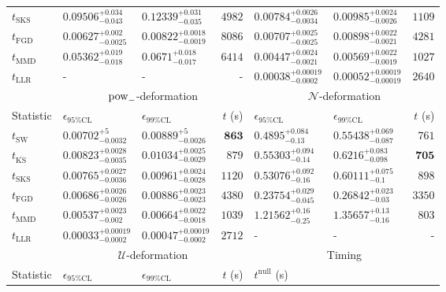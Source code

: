 \begin{tabular}{l|llr|llr}
	$t_{\mathrm{SKS}}$ & $0.09506_{-0.043}^{+0.034}$ & $0.12339_{-0.035}^{+0.031}$ & $4982$ & $0.00784_{-0.0034}^{+0.0026}$ & $0.00985_{-0.0026}^{+0.0024}$ & $1109$ \\
	$t_{\mathrm{FGD}}$ & ${\mathbf{0.00627_{-0.0025}^{+0.002}}}$ & ${\mathbf{0.00822_{-0.0019}^{+0.0018}}}$ & $8086$ & $0.00707_{-0.0025}^{+0.0025}$ & $0.00898_{-0.0021}^{+0.0022}$ & $4281$ \\
	$t_{\mathrm{MMD}}$ & $0.05362_{-0.018}^{+0.019}$ & $0.0671_{-0.017}^{+0.018}$ & $6414$ & ${\mathbf{0.00447_{-0.0021}^{+0.0024}}}$ & ${\mathbf{0.00569_{-0.0019}^{+0.0022}}}$ & $1027$ \\
	$t_{\mathrm{LLR}}$ & - & - & - & $0.00038_{-0.0002}^{+0.00019}$ & $0.00052_{-0.00019}^{+0.00019}$ & $2640$ \\
	\toprule
	\multicolumn{1}{c}{} & \multicolumn{3}{c}{$\rm{pow}_{-}$-deformation} & \multicolumn{3}{c}{$\mathcal{N}$-deformation} \\
	Statistic & $\epsilon_{95\%\mathrm{CL}}$ & $\epsilon_{99\%\mathrm{CL}}$ & $t$ (s) & $\epsilon_{95\%\mathrm{CL}}$ & $\epsilon_{99\%\mathrm{CL}}$ & $t$ (s) \\
	\midrule
	$t_{\mathrm{SW}}$ & $0.00702_{-0.0032}^{+5}$ & $0.00889_{-0.0026}^{+5}$ & ${\mathbf{863}}$ & $0.4895_{-0.13}^{+0.084}$ & $0.55438_{-0.087}^{+0.069}$ & $761$ \\
	$t_{\overline{\mathrm{KS}}}$ & $0.00823_{-0.0035}^{+0.0028}$ & $0.01034_{-0.0029}^{+0.0025}$ & $879$ & $0.55303_{-0.14}^{+0.094}$ & $0.6216_{-0.098}^{+0.083}$ & ${\mathbf{705}}$ \\
	$t_{\mathrm{SKS}}$ & $0.00765_{-0.0036}^{+0.0027}$ & $0.00961_{-0.0028}^{+0.0024}$ & $1120$ & $0.53076_{-0.16}^{+0.092}$ & $0.60111_{-0.1}^{+0.075}$ & $898$ \\
	$t_{\mathrm{FGD}}$ & $0.00686_{-0.0026}^{+0.0026}$ & $0.00886_{-0.0023}^{+0.0023}$ & $4380$ & ${\mathbf{0.23754_{-0.045}^{+0.029}}}$ & ${\mathbf{0.26842_{-0.03}^{+0.023}}}$ & $3350$ \\
	$t_{\mathrm{MMD}}$ & ${\mathbf{0.00537_{-0.002}^{+0.0023}}}$ & ${\mathbf{0.00664_{-0.0018}^{+0.0022}}}$ & $1039$ & $1.21562_{-0.25}^{+0.16}$ & $1.35657_{-0.16}^{+0.13}$ & $803$ \\
	$t_{\mathrm{LLR}}$ & $0.00033_{-0.0002}^{+0.00019}$ & $0.00047_{-0.0002}^{+0.00019}$ & $2712$ & - & - & - \\
	\toprule
	\multicolumn{1}{c}{} & \multicolumn{3}{c}{$\mathcal{U}$-deformation} & \multicolumn{3}{c}{Timing} \\
	Statistic & $\epsilon_{95\%\mathrm{CL}}$ & $\epsilon_{99\%\mathrm{CL}}$ & $t$ (s) & $t^{\mathrm{null}}$ (s) \\

\end{tabular}
